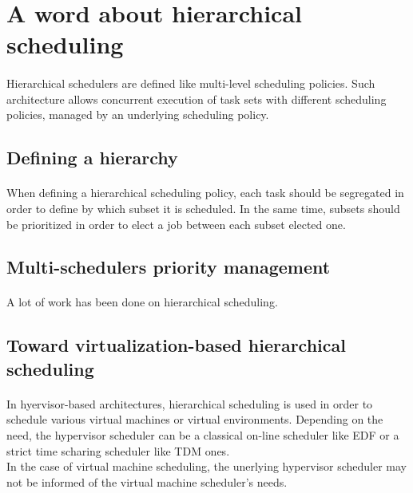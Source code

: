 \section{A word about hierarchical scheduling}

\paragraph{}
Hierarchical schedulers are defined like multi-level scheduling policies. Such architecture allows
concurrent execution of task sets with different scheduling policies, managed by an underlying
scheduling policy.

\subsection{Defining a hierarchy}

\paragraph{}
When defining a hierarchical scheduling policy, each task should be segregated in order to define by
which subset it is scheduled. In the same time, subsets should be prioritized in order to elect a
job between each subset elected one.

\subsection{Multi-schedulers priority management}

\paragraph{}
A lot of work has been done on hierarchical scheduling.

\subsection{Toward virtualization-based hierarchical scheduling}

\paragraph{}
In hyervisor-based architectures, hierarchical scheduling is used in order to schedule various
virtual machines or virtual environments. Depending on the need, the hypervisor scheduler can be a
classical on-line scheduler like EDF or a strict time scharing scheduler like TDM ones.\\
In the case of virtual machine scheduling, the unerlying hypervisor scheduler may not be informed
of the virtual machine scheduler's needs.
